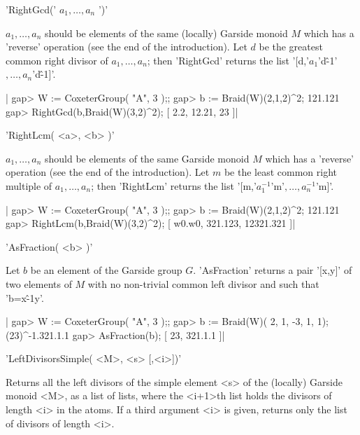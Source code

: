 

'RightGcd(' $a_1,\ldots,a_n$ ')'

$a_1,\ldots,a_n$ should be elements  of the same (locally) Garside monoid $M$
which has a  'reverse' operation (see the end of  the introduction). Let
$d$ be the greatest common right divisor of $a_1,\ldots,a_n$; then 'RightGcd'
returns the list '[d,'$a_1$'\*d\^-1'$,\ldots,a_n$'\*d\^-1]'.

|    gap>  W := CoxeterGroup( "A", 3 );;
    gap>  b := Braid(W)(2,1,2)^2;
    121.121
    gap> RightGcd(b,Braid(W)(3,2)^2);
    [ 2.2, 12.21, 23 ]|


'RightLcm( <a>, <b> )'

$a_1,\ldots,a_n$  should be elements  of the same  Garside monoid $M$ which
has a 'reverse' operation (see the end of the introduction). Let $m$ be the
least  common right  multiple of  $a_1,\ldots,a_n$; then 'RightLcm' returns
the list '[m,'$a_1^{-1}$'\*m'$,\ldots,a_n^{-1}$'\*m]'.

|    gap>  W := CoxeterGroup( "A", 3 );;
    gap>  b := Braid(W)(2,1,2)^2;
    121.121
    gap> RightLcm(b,Braid(W)(3,2)^2);
    [ w0.w0, 321.123, 12321.321 ]|


'AsFraction( <b> )'

Let $b$ be  an element of the Garside group  $G$. 'AsFraction' returns a
pair '[x,y]'  of two  elements of  $M$ with  no non-trivial  common left
divisor and such that 'b=x\^-1\*y'.

|    gap>  W := CoxeterGroup( "A", 3 );;
    gap>  b := Braid(W)( 2, 1, -3, 1, 1);
    (23)^-1.321.1.1
    gap> AsFraction(b);
    [ 23, 321.1.1 ]|


'LeftDivisorsSimple( <M>, <s> [,<i>])'

Returns  all the left divisors  of the simple element  <s> of the (locally)
Garside  monoid <M>, as a  list of lists, where  the <i+1>th list holds the
divisors  of length  <i> in  the atoms.  If a  third argument <i> is given,
returns only the list of divisors of length <i>.

